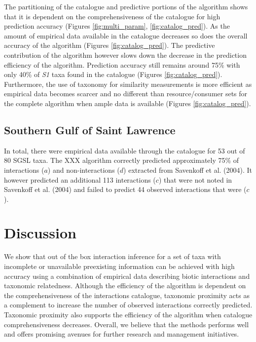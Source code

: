 \documentclass[letterpaper]{article}
\begin{document}
The partitioning of the catalogue and predictive portions of the algorithm shows that it is dependent on the comprehensiveness of the catalogue for high prediction accuracy (Figures \ref{fig:multi_param}, \ref{fig:catalog_pred}). As the amount of empirical data available in the catalogue decreases so does the overall accuracy of the algorithm (Figures \ref{fig:catalog_pred}). The predictive contribution of the algorithm however slows down the decrease in the prediction efficiency of the algorithm. Prediction accuracy still remains around 75\% with only 40\% of \textit{S1} taxa found in the catalogue (Figures \ref{fig:catalog_pred}). Furthermore, the use of taxonomy for similarity measurements is more efficient as empirical data becomes scarcer and no different than resource/consumer sets for the complete algorithm when ample data is available (Figures \ref{fig:catalog_pred}).

    \subsection{Southern Gulf of Saint Lawrence}
In total, there were empirical data available through the catalogue for 53 out of 80 SGSL taxa. The XXX algorithm correctly predicted approximately 75\% of interactions ($a$) and non-interactions ($d$) extracted from Savenkoff et al. (2004). It however predicted an additional 113 interactions ($c$) that were not noted in Savenkoff et al. (2004) and failed to predict 44 observed interactions that were ($c$).



\section{Discussion}
We show that out of the box interaction inference for a set of taxa with incomplete or unavailable preexisting information can be achieved with high accuracy using a combination of empirical data describing biotic interactions and taxonomic relatedness. Although the efficiency of the algorithm is dependent on the comprehensiveness of the interactions catalogue, taxonomic proximity acts as a complement to increase the number of observed interactions correctly predicted. Taxonomic proximity also supports the efficiency of the algorithm when catalogue comprehensiveness decreases. Overall, we believe that the methods performs well and offers promising avenues for further research and management initiatives. 
\end{document}
